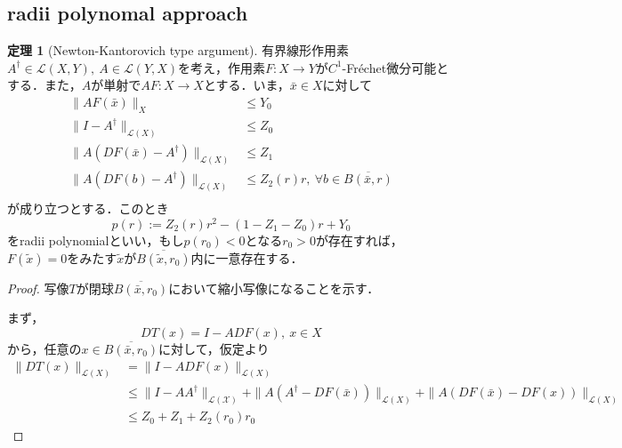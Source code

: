 \documentclass[11pt,a4paper]{jsarticle}
\theoremstyle{definition}
\newtheorem{thm}{定理}
\begin{document}
\subsection{radii polynomal approach \cite{rpa}}
\begin{thm}[Newton-Kantorovich type argument]
  有界線形作用素$A^\dagger \in \mathcal{L}(X,Y),\ A\in \mathcal{L}(Y,X)$を考え，作用素$F:X\rightarrow Y$が$C^1$-Fr\'{e}chet微分可能とする．また，$A$が単射で$AF:X\rightarrow X$とする．いま，$\bar{x} \in X$に対して%
  \begin{align*}
    \|AF(\bar{x})\|_X                             & \leq Y_0                                             \\
    \|I-A^\dagger\|_{\mathcal{L}(X)}              & \leq Z_0                                             \\
    \|A(DF(\bar{x})-A^\dagger)\|_{\mathcal{L}(X)} & \leq Z_1                                             \\
    \|A(DF(b)-A^\dagger)\|_{\mathcal{L}(X)}       & \leq Z_2(r)r,\ \forall b \in \overline{B(\bar{x},r)} \\
  \end{align*}
  が成り立つとする．このとき
  \begin{equation*}
    p(r) := Z_2(r)r^2 - (1-Z_1-Z_0)r+Y_0
  \end{equation*}
  をradii polynomialといい，もし$p(r_0)<0$となる$r_0>0$が存在すれば，$F(\tilde{x})=0$をみたす$\tilde{x}$が$\overline{B(\tilde{x},r_0)}$内に一意存在する．
\end{thm}

\begin{proof}
  写像$T$が閉球$\overline{B(\bar{x},r_0)}$において縮小写像になることを示す．

  まず，
  \begin{equation*}
    DT(x)=I-ADF(x),\ x\in X
  \end{equation*}
  から，任意の$x\in \overline{B(\bar{x},r_0)}$に対して，仮定より
  \begin{align*}
    \|DT(x)\|_{\mathcal{L}(X)} & = \|I-ADF(x)\|_{\mathcal{L}(X)}                                                                                                  \\
                               & \leq \|I-AA^\dagger\|_\mathcal{L(X)} + \|A(A^\dagger-DF(\bar{x}))\|_{\mathcal{L}(X)} + \|A(DF(\bar{x})-DF(x))\|_{\mathcal{L}(X)} \\
                               & \leq Z_0 + Z_1 + Z_2(r_0)r_0
  \end{align*}
\end{proof}
\end{document}
